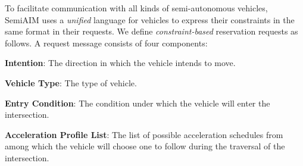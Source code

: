 To facilitate communication with all kinds of
semi-autonomous vehicles, SemiAIM uses a \emph{unified}
language for vehicles to express their constraints in the same format
in their requests.  We define \emph{constraint-based} reservation
requests as follows.  A request message consists of four components:
\begin{compactenum}
\item{\bf Intention}: The direction in which the vehicle intends to
  move.
\item{\bf Vehicle Type}: The type of vehicle.
\item{\bf Entry Condition}: The condition under which the vehicle
  will enter the intersection.
\item{\bf Acceleration Profile List}: The list of possible acceleration schedules
  from among which the vehicle will choose one to follow
  during the traversal of the intersection.
\end{compactenum}
% 
